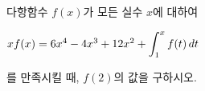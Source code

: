 다항함수 $f(x)$가 모든 실수 $x$에 대하여 \par\smallskip\noindent\hspace*{1.5em}$xf(x)=6x^4-4x^3+12x^2+\displaystyle\int_{1}^{x}f(t)\mkern3mu dt$\par\smallskip\noindent 를 만족시킬 때, $f(2)$의 값을 구하시오.
